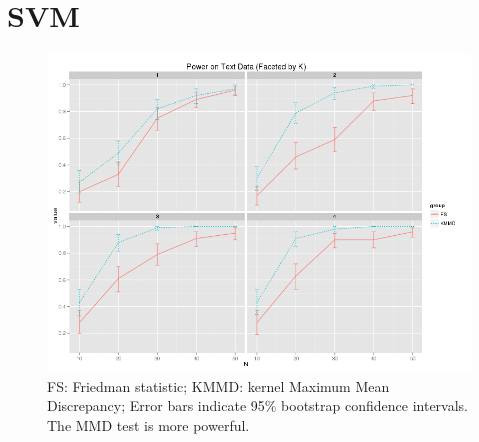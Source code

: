 \section{SVM}
\begin{figure}
  \centering
  \includegraphics[width=\linewidth]{power_string.png}
  \caption{FS: Friedman statistic; KMMD: kernel Maximum Mean
    Discrepancy; Error bars indicate 95\% bootstrap confidence
    intervals.  The MMD test is more powerful.}
  \label{fig:power_string}
\end{figure}

